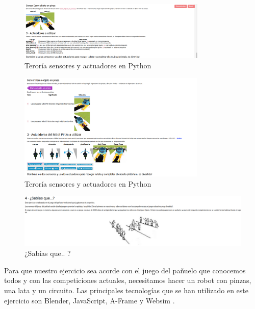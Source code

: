 \begin{figure}[H]
    \centering
    \includegraphics[width=0.8\textwidth, height=0.4\textwidth]{chapters/images/teoriag4python.png}
    \caption{Teroría sensores y actuadores en Python}
    \label{fig:my_label}
\end{figure}
\begin{figure}[H]
    \centering
    \includegraphics[width=0.8\textwidth, height=0.4\textwidth]{chapters/images/teoriag4scratch.png}
    \caption{Teroría sensores y actuadores en Python}
    \label{fig:my_label}
\end{figure}
\begin{figure}[H]
    \centering
    \includegraphics[width=1 \textwidth, height=0.3\textwidth]{chapters/images/teoriag5.png}
    \caption{¿Sabías que.. ?}
    \label{fig:my_label}
\end{figure}

Para que nuestro ejercicio sea acorde con el juego del pañuelo que conocemos todos y con las competiciones actuales, necesitamos hacer un robot con pinzas, una lata  y un circuito. Las principales tecnologías que se han utilizado en este ejercicio son Blender, JavaScript, A-Frame y Websim .

